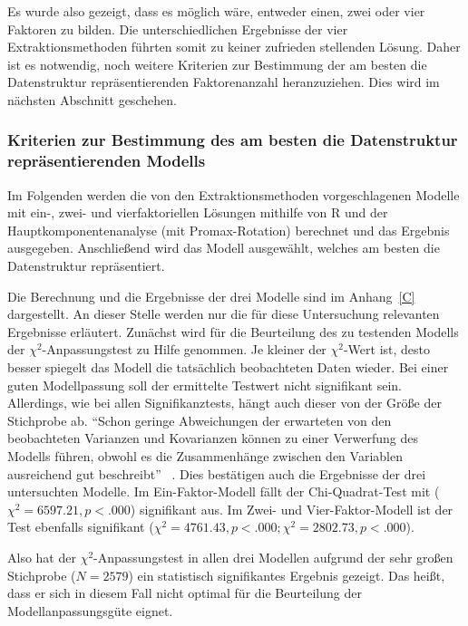 \documentclass[12pt,a4paper]{article}
\begin{document}
	Es wurde also gezeigt, dass es möglich wäre, entweder einen, zwei oder vier Faktoren zu bilden. Die unterschiedlichen Ergebnisse der vier Extraktionsmethoden führten somit zu keiner zufrieden stellenden Lösung. Daher  ist es notwendig, noch weitere Kriterien zur Bestimmung der am besten die Datenstruktur repräsentierenden Faktorenanzahl heranzuziehen. Dies wird im nächsten Abschnitt geschehen.

\subsubsection{Kriterien zur Bestimmung des am besten die Datenstruktur repräsentierenden Modells}
 
Im Folgenden werden die von den Extraktionsmethoden vorgeschlagenen Modelle mit ein-, zwei- und vierfaktoriellen Lösungen mithilfe von R und der Hauptkomponentenanalyse (mit Promax-Rotation) berechnet und das Ergebnis ausgegeben. Anschließend wird das Modell ausgewählt, welches am besten die Datenstruktur repräsentiert.

	Die Berechnung und die Ergebnisse der drei Modelle sind im Anhang~\ref{C} dargestellt. An dieser Stelle werden nur die für diese Untersuchung relevanten Ergebnisse erläutert. Zunächst wird für die Beurteilung des zu testenden Modells der $\chi^2$-Anpassungstest zu Hilfe genommen. Je kleiner der $\chi^2$-Wert ist, desto besser spiegelt das Modell die tatsächlich beobachteten Daten wieder. Bei einer guten Modellpassung soll der ermittelte Testwert nicht signifikant sein. Allerdings, wie bei allen Signifikanztests, hängt auch dieser von der Größe der Stichprobe ab. "`Schon geringe Abweichungen der erwarteten von den beobachteten Varianzen und Kovarianzen können zu einer Verwerfung des Modells führen, obwohl es die Zusammenhänge zwischen den Variablen ausreichend gut beschreibt"' ~\parencite[S.~898]{Eid_2013}. Dies bestätigen auch die Ergebnisse der drei untersuchten Modelle. Im Ein-Faktor-Modell fällt der Chi-Quadrat-Test mit ($\chi^2 = 6597.21, p< .000$) signifikant aus. Im Zwei- und Vier-Faktor-Modell ist der Test ebenfalls signifikant ($\chi^2  = 4761.43, p< .000;  \chi^2 = 2802.73, p < .000$).
	
	Also hat der $\chi^2$-Anpassungstest in allen drei Modellen aufgrund der sehr großen Stichprobe ($N = 2579$) ein statistisch signifikantes Ergebnis gezeigt. Das heißt, dass er sich in diesem Fall nicht optimal für die Beurteilung der Modellanpassungsgüte eignet.
	
\end{document}
